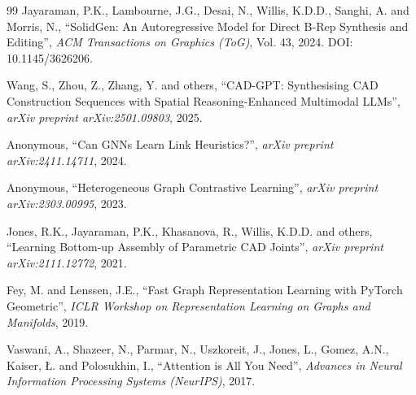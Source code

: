 \documentclass[12pt]{report}
\begin{document}
\begin{thebibliography}{99}
Jayaraman, P.K., Lambourne, J.G., Desai, N., Willis, K.D.D., Sanghi, A. and Morris, N., ``SolidGen: An Autoregressive Model for Direct B-Rep Synthesis and Editing'', \textit{ACM Transactions on Graphics (ToG)}, Vol. 43, 2024. DOI: 10.1145/3626206.

Wang, S., Zhou, Z., Zhang, Y. and others, ``CAD-GPT: Synthesising CAD Construction Sequences with Spatial Reasoning-Enhanced Multimodal LLMs'', \textit{arXiv preprint arXiv:2501.09803}, 2025.

Anonymous, ``Can GNNs Learn Link Heuristics?'', \textit{arXiv preprint arXiv:2411.14711}, 2024.

Anonymous, ``Heterogeneous Graph Contrastive Learning'', \textit{arXiv preprint arXiv:2303.00995}, 2023.

Jones, R.K., Jayaraman, P.K., Khasanova, R., Willis, K.D.D. and others, ``Learning Bottom-up Assembly of Parametric CAD Joints'', \textit{arXiv preprint arXiv:2111.12772}, 2021.

Fey, M. and Lenssen, J.E., ``Fast Graph Representation Learning with PyTorch Geometric'', \textit{ICLR Workshop on Representation Learning on Graphs and Manifolds}, 2019.

Vaswani, A., Shazeer, N., Parmar, N., Uszkoreit, J., Jones, L., Gomez, A.N., Kaiser, {\L}. and Polosukhin, I., ``Attention is All You Need'', \textit{Advances in Neural Information Processing Systems (NeurIPS)}, 2017.

\end{thebibliography}
\end{document}
